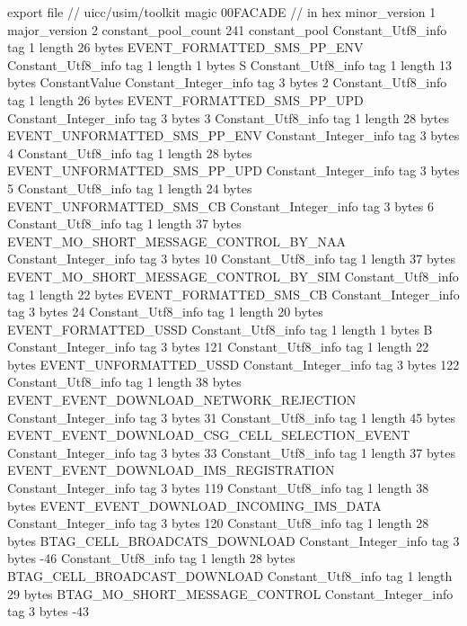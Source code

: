 export file {		// uicc/usim/toolkit
	magic	00FACADE		 // in hex
	minor_version	1
	major_version	2
	constant_pool_count	241
	constant_pool {
		Constant_Utf8_info {
			tag	1
			length	26
			bytes	EVENT_FORMATTED_SMS_PP_ENV
		}
		Constant_Utf8_info {
			tag	1
			length	1
			bytes	S
		}
		Constant_Utf8_info {
			tag	1
			length	13
			bytes	ConstantValue
		}
		Constant_Integer_info {
			tag	3
			bytes	2
		}
		Constant_Utf8_info {
			tag	1
			length	26
			bytes	EVENT_FORMATTED_SMS_PP_UPD
		}
		Constant_Integer_info {
			tag	3
			bytes	3
		}
		Constant_Utf8_info {
			tag	1
			length	28
			bytes	EVENT_UNFORMATTED_SMS_PP_ENV
		}
		Constant_Integer_info {
			tag	3
			bytes	4
		}
		Constant_Utf8_info {
			tag	1
			length	28
			bytes	EVENT_UNFORMATTED_SMS_PP_UPD
		}
		Constant_Integer_info {
			tag	3
			bytes	5
		}
		Constant_Utf8_info {
			tag	1
			length	24
			bytes	EVENT_UNFORMATTED_SMS_CB
		}
		Constant_Integer_info {
			tag	3
			bytes	6
		}
		Constant_Utf8_info {
			tag	1
			length	37
			bytes	EVENT_MO_SHORT_MESSAGE_CONTROL_BY_NAA
		}
		Constant_Integer_info {
			tag	3
			bytes	10
		}
		Constant_Utf8_info {
			tag	1
			length	37
			bytes	EVENT_MO_SHORT_MESSAGE_CONTROL_BY_SIM
		}
		Constant_Utf8_info {
			tag	1
			length	22
			bytes	EVENT_FORMATTED_SMS_CB
		}
		Constant_Integer_info {
			tag	3
			bytes	24
		}
		Constant_Utf8_info {
			tag	1
			length	20
			bytes	EVENT_FORMATTED_USSD
		}
		Constant_Utf8_info {
			tag	1
			length	1
			bytes	B
		}
		Constant_Integer_info {
			tag	3
			bytes	121
		}
		Constant_Utf8_info {
			tag	1
			length	22
			bytes	EVENT_UNFORMATTED_USSD
		}
		Constant_Integer_info {
			tag	3
			bytes	122
		}
		Constant_Utf8_info {
			tag	1
			length	38
			bytes	EVENT_EVENT_DOWNLOAD_NETWORK_REJECTION
		}
		Constant_Integer_info {
			tag	3
			bytes	31
		}
		Constant_Utf8_info {
			tag	1
			length	45
			bytes	EVENT_EVENT_DOWNLOAD_CSG_CELL_SELECTION_EVENT
		}
		Constant_Integer_info {
			tag	3
			bytes	33
		}
		Constant_Utf8_info {
			tag	1
			length	37
			bytes	EVENT_EVENT_DOWNLOAD_IMS_REGISTRATION
		}
		Constant_Integer_info {
			tag	3
			bytes	119
		}
		Constant_Utf8_info {
			tag	1
			length	38
			bytes	EVENT_EVENT_DOWNLOAD_INCOMING_IMS_DATA
		}
		Constant_Integer_info {
			tag	3
			bytes	120
		}
		Constant_Utf8_info {
			tag	1
			length	28
			bytes	BTAG_CELL_BROADCATS_DOWNLOAD
		}
		Constant_Integer_info {
			tag	3
			bytes	-46
		}
		Constant_Utf8_info {
			tag	1
			length	28
			bytes	BTAG_CELL_BROADCAST_DOWNLOAD
		}
		Constant_Utf8_info {
			tag	1
			length	29
			bytes	BTAG_MO_SHORT_MESSAGE_CONTROL
		}
		Constant_Integer_info {
			tag	3
			bytes	-43
}}}
